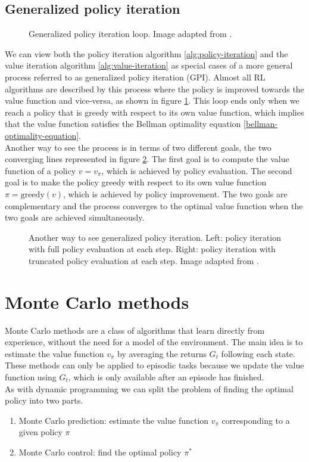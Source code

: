 \subsection{Generalized policy iteration}
\begin{figure}
    \centering
    
    \caption{Generalized policy iteration loop. Image adapted from \cite{sutton-barto}.}
    \label{fig:gpi}
\end{figure} 
We can view both the policy iteration algorithm \ref{alg:policy-iteration} and the value iteration algorithm \ref{alg:value-iteration} as special cases of a more general process referred to as generalized policy iteration (GPI). Almost all RL algorithms are described by this process where the policy is improved towards the value function and vice-versa, as shown in figure \ref{fig:gpi}. This loop ends only when we reach a policy that is greedy with respect to its own value function, which implies that the value function satisfies the Bellman optimality equation \eqref{bellman-optimality-equation}.\\
Another way to see the process is in terms of two different goals, the two converging lines represented in figure \ref{fig:gpi2}. The first goal is to compute the value function of a policy $v=v_{\pi}$, which is achieved by policy evaluation. The second goal is to make the policy greedy with respect to its own value function $\pi=\mathrm{greedy}(v)$, which is achieved by policy improvement. The two goals are complementary and the process converges to the optimal value function when the two goals are achieved simultaneously.
\begin{figure}[H]
    \centering
    
    \caption{Another way to see generalized policy iteration. Left: policy iteration with full policy evaluation at each step. Right: policy iteration with truncated policy evaluation at each step. Image adapted from \cite{sutton-barto}.}
    \label{fig:gpi2}
\end{figure}

\section{Monte Carlo methods}
Monte Carlo methods are a class of algorithms that learn directly from experience, without the need for a model of the environment. The main idea is to estimate the value function $v_{\pi}$ by averaging the returns $G_t$ following each state. These methods can only be applied to episodic tasks because we update the value function using $G_t$, which is only available after an episode has finished.\\
As with dynamic programming we can split the problem of finding the optimal policy into two parts.
\begin{enumerate}
    \item Monte Carlo prediction: estimate the value function $v_{\pi}$ corresponding to a given policy $\pi$
    \item Monte Carlo control: find the optimal policy $\pi^*$
\end{enumerate}

